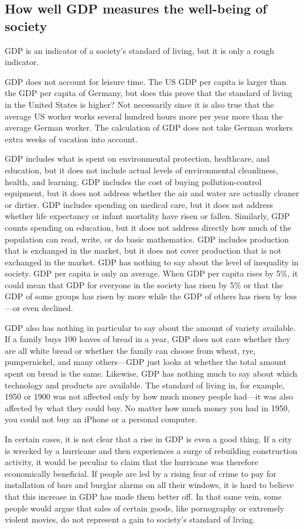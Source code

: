 \subsection{How well GDP measures the well-being of society}
GDP is an indicator of a society’s standard of living, but it is only a rough indicator. 

GDP does not account for leisure time. The US GDP per capita is larger than the GDP per capita of Germany, but does this prove that the standard of living in the United States is higher? Not necessarily since it is also true that the average US worker works several hundred hours more per year more than the average German worker. The calculation of GDP does not take German workers extra weeks of vacation into account.

GDP includes what is spent on environmental protection, healthcare, and education, but it does not include actual levels of environmental cleanliness, health, and learning. GDP includes the cost of buying pollution-control equipment, but it does not address whether the air and water are actually cleaner or dirtier. GDP includes spending on medical care, but it does not address whether life expectancy or infant mortality have risen or fallen. Similarly, GDP counts spending on education, but it does not address directly how much of the population can read, write, or do basic mathematics.
GDP includes production that is exchanged in the market, but it does not cover production that is not exchanged in the market. 
GDP has nothing to say about the level of inequality in society. GDP per capita is only an average. When GDP per capita rises by 5\%, it could mean that GDP for everyone in the society has risen by 5\% or that the GDP of some groups has risen by more while the GDP of others has risen by less—or even declined.

GDP also has nothing in particular to say about the amount of variety available. If a family buys 100 loaves of bread in a year, GDP does not care whether they are all white bread or whether the family can choose from wheat, rye, pumpernickel, and many others—GDP just looks at whether the total amount spent on bread is the same.
Likewise, GDP has nothing much to say about which technology and products are available. The standard of living in, for example, 1950 or 1900 was not affected only by how much money people had—it was also affected by what they could buy. No matter how much money you had in 1950, you could not buy an iPhone or a personal computer.

In certain cases, it is not clear that a rise in GDP is even a good thing. If a city is wrecked by a hurricane and then experiences a surge of rebuilding construction activity, it would be peculiar to claim that the hurricane was therefore economically beneficial. If people are led by a rising fear of crime to pay for installation of bars and burglar alarms on all their windows, it is hard to believe that this increase in GDP has made them better off. In that same vein, some people would argue that sales of certain goods, like pornography or extremely violent movies, do not represent a gain to society’s standard of living.

